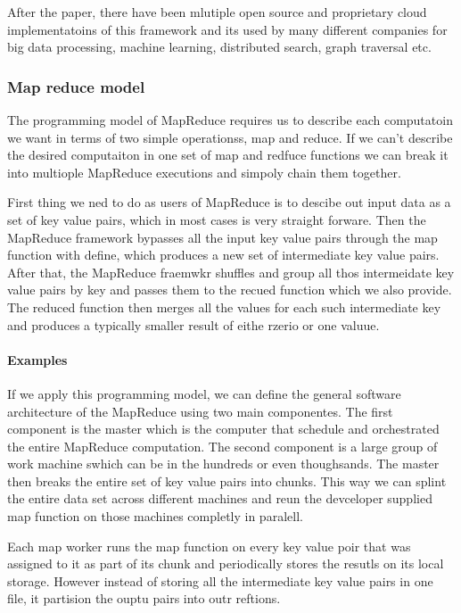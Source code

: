 \documentclass[a4paper, 11pt]{book}
\begin{document}
    After the paper, there have been mlutiple open source and proprietary cloud implementatoins of this framework and its used by many different companies for big data processing, machine learning, distributed search, graph traversal etc.

    \subsubsection{Map reduce model}
    The programming model of MapReduce requires us to describe each computatoin we want in terms of two simple operationss, map and reduce.
    If we can't describe the desired computaiton in one set of map and redfuce functions we can break it into multiople MapReduce executions and simpoly chain them together.

    First thing we ned to do as users of MapReduce is to descibe out input data as a set of key value pairs, which in most cases is very straight forware.
    Then the MapReduce framework bypasses all the input key value pairs through the map function with define, which produces a new set of intermediate key value pairs.
    After that, the MapReduce fraemwkr shuffles and group all thos intermeidate key value pairs by key and passes them to the recued function which we also provide.
    The reduced function then merges all the values for each such intermediate key and produces a typically smaller result of eithe rzerio or one valuue.

    \paragraph{Examples}

    If we apply this programming model, we can define the general software architecture of the MapReduce using two main componentes.
    The first component is the master which is the computer that schedule and orchestrated the entire MapReduce computation.
    The second component is a large group of work machine swhich can be in the hundreds or even thoughsands.
    The master then breaks the entire set of key value pairs into chunks.
    This way we can splint the entire data set across different machines and reun the devceloper supplied map function on those machines completly in paralell.

    Each map worker runs the map function on every key value poir that was assigned to it as part of its chunk and periodically stores the resutls on its local storage.
    However instead of storing all the intermediate key value pairs in one file, it partision the ouptu pairs into outr reftions.
\end{document}
